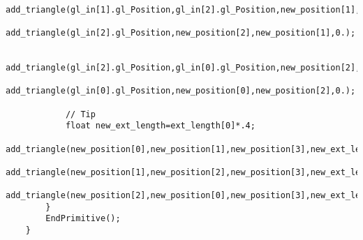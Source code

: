 \begin{minipage}{1.0\textwidth}
\begin{lstlisting}
            add_triangle(gl_in[1].gl_Position,gl_in[2].gl_Position,new_position[1],0.);
            add_triangle(gl_in[2].gl_Position,new_position[2],new_position[1],0.);
            
            add_triangle(gl_in[2].gl_Position,gl_in[0].gl_Position,new_position[2],0.);
            add_triangle(gl_in[0].gl_Position,new_position[0],new_position[2],0.);
            
            // Tip
            float new_ext_length=ext_length[0]*.4;
            add_triangle(new_position[0],new_position[1],new_position[3],new_ext_length);
            add_triangle(new_position[1],new_position[2],new_position[3],new_ext_length);
            add_triangle(new_position[2],new_position[0],new_position[3],new_ext_length);
        }
        EndPrimitive();
    }
\end{lstlisting}
\end{minipage}